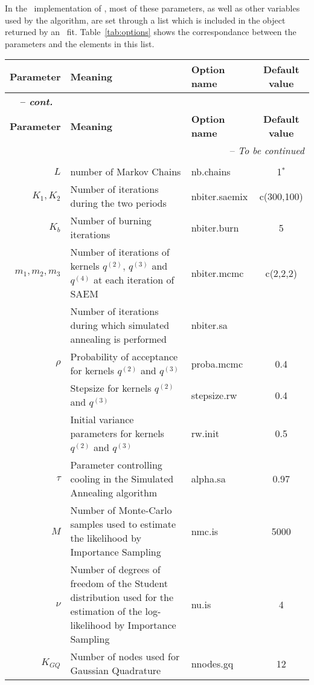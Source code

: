 In the \R~implementation of \monolix, most of these parameters, as well as other variables used by the algorithm, are set through a list which is included in the object returned by an \monolix~fit. Table~\ref{tab:options} shows the correspondance between the parameters and the elements in this list.
\begin{center}
\begin{longtable}{r p{8cm} p{3cm} c}
\hline {\bf Parameter} & {\bf Meaning} & {\bf Option name} & {\bf Default value}\\
\hline
\endfirsthead
\multicolumn{4}{l}{{\itshape \bfseries \tablename\ \thetable{} -- cont.}} \\
\hline {\bf Parameter} & {\bf Meaning} & {\bf Option name} & {\bf Default value}\\
\hline
\endhead
\hline \multicolumn{4}{r}{{-- {\it To be continued}}} \\ 
\endfoot
\endlastfoot
& & \\
\hline
$L$ & number of Markov Chains & {\sf nb.chains} & 1$^*$ \\
$K_1, K_2$ & Number of iterations during the two periods & {\sf nbiter.saemix} & c(300,100)\\
$K_b$ & Number of burning iterations & {\sf nbiter.burn} & 5 \\
$m_1, m_2, m_3$ & Number of iterations of kernels $q^{(2)}$, $q^{(3)}$ and $q^{(4)}$ at each iteration of SAEM& {\sf nbiter.mcmc} & c(2,2,2)\\
 & Number of iterations during which simulated annealing is performed & {\sf nbiter.sa} &  \\
$\rho$ & Probability of acceptance for kernels $q^{(2)}$ and $q^{(3)}$ & {\sf proba.mcmc} & 0.4 \\
 & Stepsize for kernels $q^{(2)}$ and $q^{(3)}$ & {\sf stepsize.rw} & 0.4 \\
 & Initial variance parameters for kernels $q^{(2)}$ and $q^{(3)}$ & {\sf rw.init} & 0.5\\
$\tau$ & Parameter controlling cooling in the Simulated Annealing algorithm & {\sf alpha.sa} & 0.97 \\
$M$ & Number of Monte-Carlo samples used to estimate the likelihood by Importance Sampling & {\sf nmc.is} & 5000 \\
$\nu$ & Number of degrees of freedom of the Student distribution used for the estimation of the log-likelihood by Importance Sampling & {\sf nu.is} & 4 \\
$K_{GQ}$ & Number of nodes used for Gaussian Quadrature & {\sf nnodes.gq} & 12 \\

\end{longtable}
\end{center}

